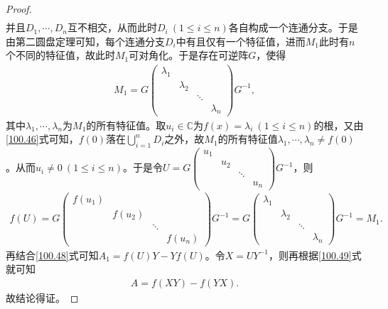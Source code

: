 \documentclass[../../main.tex]{subfiles}%
\begin{document}
\begin{proof}
\begin{align}
\end{align}
并且$D_1, \cdots, D_n$互不相交，从而此时$D_i\ (1 \leqslant i \leqslant n)$各自构成一个连通分支。于是由第二圆盘定理可知，每个连通分支$D_i$中有且仅有一个特征值，进而$M_1$此时有$n$个不同的特征值，故此时$M_1$可对角化。于是存在可逆阵$G$，使得
\begin{align*}
M_1 = G\begin{pmatrix}
\lambda_1 & & & \\
& \lambda_2 & & \\
& & \ddots & \\
& & & \lambda_n
\end{pmatrix}G^{-1},
\end{align*}
其中$\lambda_1, \cdots, \lambda_n$为$M_1$的所有特征值。取$u_i \in \mathbb{C}$为$f(x) = \lambda_i\ (1 \leqslant i \leqslant n)$的根，又由\eqref{100.46}式可知，$f(0)$落在$\bigcup_{i=1}^n D_i$之外，故$M_1$的所有特征值$\lambda_1, \cdots, \lambda_n \ne f(0)$。从而$u_i \ne 0\ (1 \leqslant i \leqslant n)$。于是令$U = G\begin{pmatrix}
u_1 & & & \\
& u_2 & & \\
& & \ddots & \\
& & & u_n
\end{pmatrix}G^{-1}$，则
\begin{align*}
f(U) = G\begin{pmatrix}
f(u_1) & & & \\
& f(u_2) & & \\
& & \ddots & \\
& & & f(u_n)
\end{pmatrix}G^{-1} = G\begin{pmatrix}
\lambda_1 & & & \\
& \lambda_2 & & \\
& & \ddots & \\
& & & \lambda_n
\end{pmatrix}G^{-1} = M_1.
\end{align*}
再结合\eqref{100.48}式可知$A_1 = f(U)Y - Yf(U)$。令$X = UY^{-1}$，则再根据\eqref{100.49}式就可知
\begin{align*}
A = f(XY) - f(YX).
\end{align*}
故结论得证。

\end{proof}
\end{document}
